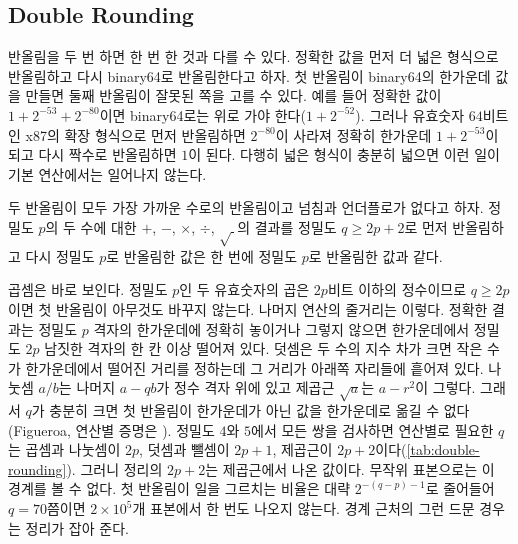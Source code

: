 \subsection{Double Rounding}

반올림을 두 번 하면 한 번 한 것과 다를 수 있다. 정확한 값을 먼저 더 넓은 형식으로 반올림하고 다시 binary64로 반올림한다고 하자. 첫 반올림이 binary64의 한가운데 값을 만들면 둘째 반올림이 잘못된 쪽을 고를 수 있다. 예를 들어 정확한 값이 $1+2^{-53}+2^{-80}$이면 binary64로는 위로 가야 한다($1+2^{-52}$). 그러나 유효숫자 $64$비트인 x87의 확장 형식으로 먼저 반올림하면 $2^{-80}$이 사라져 정확히 한가운데 $1+2^{-53}$이 되고 다시 짝수로 반올림하면 $1$이 된다. 다행히 넓은 형식이 충분히 넓으면 이런 일이 기본 연산에서는 일어나지 않는다.

\begin{theorem}[Figueroa]
\label{thm:double-rounding}
두 반올림이 모두 가장 가까운 수로의 반올림이고 넘침과 언더플로가 없다고 하자. 정밀도 $p$의 두 수에 대한 $+$, $-$, $\times$, $\div$, $\sqrt{\ }$의 결과를 정밀도 $q\ge2p+2$로 먼저 반올림하고 다시 정밀도 $p$로 반올림한 값은 한 번에 정밀도 $p$로 반올림한 값과 같다.
\end{theorem}

곱셈은 바로 보인다. 정밀도 $p$인 두 유효숫자의 곱은 $2p$비트 이하의 정수이므로 $q\ge2p$이면 첫 반올림이 아무것도 바꾸지 않는다. 나머지 연산의 줄거리는 이렇다. 정확한 결과는 정밀도 $p$ 격자의 한가운데에 정확히 놓이거나 그렇지 않으면 한가운데에서 정밀도 $2p$ 남짓한 격자의 한 칸 이상 떨어져 있다. 덧셈은 두 수의 지수 차가 크면 작은 수가 한가운데에서 떨어진 거리를 정하는데 그 거리가 아래쪽 자리들에 흩어져 있다. 나눗셈 $a/b$는 나머지 $a-qb$가 정수 격자 위에 있고 제곱근 $\sqrt a$는 $a-r^2$이 그렇다. 그래서 $q$가 충분히 크면 첫 반올림이 한가운데가 아닌 값을 한가운데로 옮길 수 없다(Figueroa\cite{figueroa1995}, 연산별 증명은 \cite{muller2018handbook}). 정밀도 $4$와 $5$에서 모든 쌍을 검사하면 연산별로 필요한 $q$는 곱셈과 나눗셈이 $2p$, 덧셈과 뺄셈이 $2p+1$, 제곱근이 $2p+2$이다(\cref{tab:double-rounding}). 그러니 정리의 $2p+2$는 제곱근에서 나온 값이다. 무작위 표본으로는 이 경계를 볼 수 없다. 첫 반올림이 일을 그르치는 비율은 대략 $2^{-(q-p)-1}$로 줄어들어 $q=70$쯤이면 $2\times10^5$개 표본에서 한 번도 나오지 않는다. 경계 근처의 그런 드문 경우는 정리가 잡아 준다.

